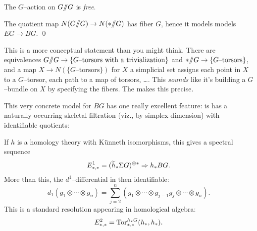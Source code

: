 \begin{remark}
The $G$--action on $G /\!\!/ G$ is \emph{free}.
\end{remark}

\begin{corollary}
The quotient map $N(G /\!\!/ G) \to N(* /\!\!/ G)$ has fiber $G$, hence it models models $EG \to BG$. \qed
\end{corollary}

\begin{remark}
This is a more conceptual statement than you might think.
There are equivalences $G /\!\!/ G \to \{\text{$G$--torsors with a trivialization}\}$ and $* /\!\!/ G \to \{\text{$G$--torsors}\}$, and a map $X \to N(\{\text{$G$--torsors}\})$ for $X$ a simplicial set assigns each point in $X$ to a $G$--torsor, each path to a map of torsors, \ldots .
This \emph{sounds} like it's building a $G$--bundle on $X$ by specifying the fibers.
The  makes this precise.
\end{remark}

This very concrete model for $BG$ has one really excellent feature: is has a naturally occurring skeletal filtration (viz., by simplex dimension) with identifiable quotients:

\begin{figure*}
\begin{center}
\end{center}
\end{figure*}

If $h$ is a homology theory with K\"unneth isomorphisms, this gives a spectral sequence \[E^1_{*, *} = (\widetilde h_* \Sigma G)^{\otimes *} \Rightarrow h_* BG.\]  More than this, the $d^1$--differential in then identifiable: \[d_1(g_1 \otimes \cdots \otimes g_n) = \sum_{j=2}^n (g_1 \otimes \cdots \otimes g_{j-1} g_j \otimes \cdots \otimes g_n).\]  This is a standard resolution appearing in homological algebra:
\[E_{*, *}^2 = \operatorname{Tor}^{h_* G}_{*, *}(h_*, h_*).\]




